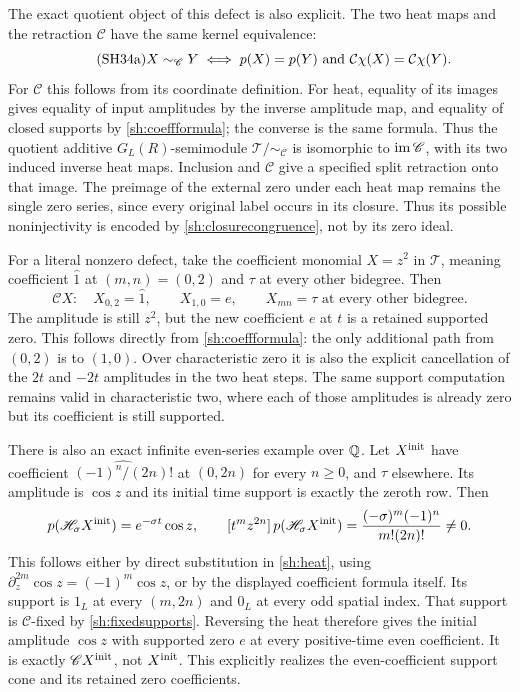 \documentclass[11pt,a4paper]{article}
\theoremstyle{definition}\newtheorem{definition}[theorem]{Definition}
\begin{document}
The exact quotient object of this defect is also explicit.
The two heat maps and the retraction $\mathscr C$ have the
same kernel equivalence:
\begin{equation}\tag{SH34a}\label{sh:closurecongruence}
 X\sim_{\mathscr C}Y
 \iff p(X)=p(Y)\ \hbox{and}\
            \mathcal C\chi(X)=\mathcal C\chi(Y).
\end{equation}
For $\mathscr C$ this follows from its coordinate definition.
For heat, equality of its images gives equality of input
amplitudes by the inverse amplitude map, and equality of
closed supports by \eqref{sh:coeffformula}; the converse is
the same formula. Thus the quotient additive $G_L(R)$-semimodule
$\mathscr T/{\sim_{\mathscr C}}$ is isomorphic to
$\operatorname{im}\mathscr C$, with its two induced inverse heat maps.
Inclusion and $\mathscr C$ give a specified split retraction
onto that image. The preimage of the external zero under each
heat map remains the single zero series, since every original
label occurs in its closure. Thus its possible noninjectivity
is encoded by \eqref{sh:closurecongruence}, not by its zero ideal.

For a literal nonzero defect, take the coefficient monomial
$X=z^2$ in $\mathscr T$, meaning coefficient $\widehat1$
at $(m,n)=(0,2)$ and $\tau$ at every other bidegree. Then
\begin{equation}\tag{SH35}\label{sh:zerotail}
 \mathscr C X:
 \quad X_{0,2}=\widehat1,\qquad
 X_{1,0}=e,\qquad
 X_{mn}=\tau\text{ at every other bidegree}.
\end{equation}
The amplitude is still $z^2$, but the new coefficient $e$ at
$t$ is a retained supported zero. This follows directly from
\eqref{sh:coeffformula}: the only additional path from $(0,2)$
is to $(1,0)$. Over characteristic zero it is also the explicit
cancellation of the $2t$ and $-2t$ amplitudes in the two heat
steps. The same support computation remains valid in
characteristic two, where each of those amplitudes is already
zero but its coefficient is still supported.

There is also an exact infinite even-series example over $\mathbb Q$.
Let $X^{\rm init}$ have coefficient
$\widehat{(-1)^n/(2n)!}$ at $(0,2n)$ for every $n\ge0$,
and $\tau$ elsewhere. Its amplitude is $\cos z$ and its
initial time support is exactly the zeroth row. Then
\[
 p(\mathscr H_\sigma X^{\rm init})
       =e^{-\sigma t}\cos z,\qquad
 [t^mz^{2n}]\,p(\mathscr H_\sigma X^{\rm init})
       =\frac{(-\sigma)^m(-1)^n}{m!(2n)!}\ne0 .
\]
This follows either by direct substitution in \eqref{sh:heat},
using $\partial_z^{2m}\cos z=(-1)^m\cos z$, or by the
displayed coefficient formula itself. Its support is $1_L$ at
every $(m,2n)$ and $0_L$ at every odd spatial index.
That support is $\mathcal C$-fixed by \eqref{sh:fixedsupports}.
Reversing the heat therefore gives the initial amplitude
$\cos z$ with supported zero $e$ at every positive-time even
coefficient. It is exactly $\mathscr C X^{\rm init}$, not
$X^{\rm init}$. This explicitly realizes the even-coefficient
support cone and its retained zero coefficients.
\end{document}
